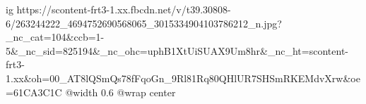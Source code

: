  
 
 
 
 

\ifcmt
  ig https://scontent-frt3-1.xx.fbcdn.net/v/t39.30808-6/263244222_4694752690568065_3015334904103786212_n.jpg?_nc_cat=104&ccb=1-5&_nc_sid=825194&_nc_ohc=uphB1XtUiSUAX9Um8hr&_nc_ht=scontent-frt3-1.xx&oh=00_AT8lQSmQs78fFqoGn_9Rl81Rq80QHlUR7SHSmRKEMdvXrw&oe=61CA3C1C
  @width 0.6
	@wrap center
\fi
